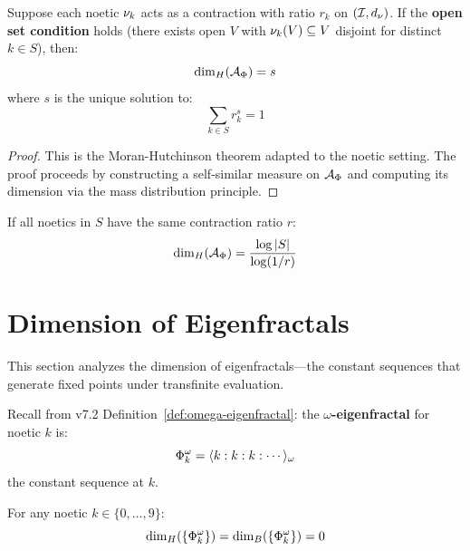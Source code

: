 \begin{theorem}
\label{thm:ifs-dimension}
Suppose each noetic $\nu_{k}$ acts as a contraction with ratio $r_k$ on $(\mathcal{I}, d_\nu)$. If the \textbf{open set condition} holds (there exists open $V$ with $\nu_{k}(V) \subseteq V$ disjoint for distinct $k \in S$), then:
\[
\dim_H(\mathcal{A}_\Phi) = s
\]
where $s$ is the unique solution to:
\[
\sum_{k \in S} r_k^s = 1
\]
\end{theorem}

\begin{proof}
This is the Moran-Hutchinson theorem adapted to the noetic setting. The proof proceeds by constructing a self-similar measure on $\mathcal{A}_\Phi$ and computing its dimension via the mass distribution principle.
\end{proof}

\begin{corollary}
\label{cor:uniform-contraction}
If all noetics in $S$ have the same contraction ratio $r$:
\[
\dim_H(\mathcal{A}_\Phi) = \frac{\log |S|}{\log(1/r)}
\]
\end{corollary}

\section{Dimension of Eigenfractals}
\label{sec:eigenfractal-dimension}

\begin{tcolorbox}[colback=blue!5!white,colframe=blue!75!black,title=\vnewthree]
This section analyzes the dimension of eigenfractals---the constant sequences that generate fixed points under transfinite evaluation.
\end{tcolorbox}

\begin{definition}
\label{def:eigenfractal-review}
Recall from v7.2 Definition~\ref*{def:omega-eigenfractal}: the \textbf{$\omega$-eigenfractal} for noetic $k$ is:
\[
\Phi^{\omega}_k = \langle k : k : k : \cdots \rangle_\omega
\]
the constant sequence at $k$.
\end{definition}

\begin{theorem}
\label{thm:eigenfractal-dim-zero}
For any noetic $k \in \{0, \ldots, 9\}$:
\[
\dim_H(\{\Phi^{\omega}_k\}) = \dim_B(\{\Phi^{\omega}_k\}) = 0
\]
\end{theorem}

